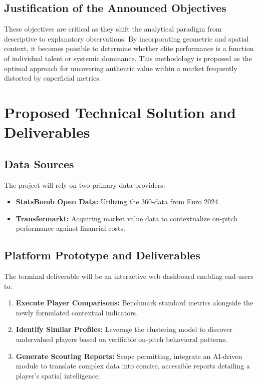 \documentclass[12pt,a4paper]{article}
\begin{document}
\subsection{Justification of the Announced Objectives}
These objectives are critical as they shift the analytical paradigm from descriptive to explanatory observations. By incorporating geometric and spatial context, it becomes possible to determine whether elite performance is a function of individual talent or systemic dominance. This methodology is proposed as the optimal approach for uncovering authentic value within a market frequently distorted by superficial metrics.

\section{Proposed Technical Solution and Deliverables}

\subsection{Data Sources}
The project will rely on two primary data providers:
\begin{itemize}
    \item \textbf{StatsBomb Open Data:} Utilizing the 360-data from Euro 2024. 
    \item \textbf{Transfermarkt:} Acquiring market value data to contextualize on-pitch performance against financial costs.
\end{itemize}

\subsection{Platform Prototype and Deliverables}
The terminal deliverable will be an interactive web dashboard enabling end-users to:
\begin{enumerate}
    \item \textbf{Execute Player Comparisons:} Benchmark standard metrics alongside the newly formulated contextual indicators.
    \item \textbf{Identify Similar Profiles:} Leverage the clustering model to discover undervalued players based on verifiable on-pitch behavioral patterns.
    \item \textbf{Generate Scouting Reports:} Scope permitting, integrate an AI-driven module to translate complex data into concise, accessible reports detailing a player's spatial intelligence.
\end{enumerate}
\end{document}
